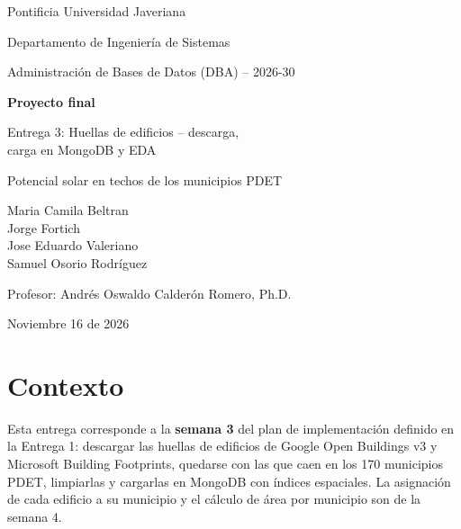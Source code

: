 \documentclass[11pt,a4paper]{article}
\begin{document}
\begin{titlepage}
  \centering
  {\large Pontificia Universidad Javeriana\par}
  {\large Departamento de Ingeniería de Sistemas\par}
  \vspace{0.8cm}
  {\large Administración de Bases de Datos (DBA) -- 2026-30\par}
  \vspace{2.5cm}
  {\Huge\bfseries Proyecto final\par}
  \vspace{1cm}
  {\LARGE Entrega 3: Huellas de edificios -- descarga,\\ carga en MongoDB y EDA\par}
  \vspace{1cm}
  {\large Potencial solar en techos de los municipios PDET\par}
  \vspace{3cm}
  {\large
    Maria Camila Beltran \\
    \vspace{0.5cm}
    Jorge Fortich \\
    \vspace{0.5cm}
    Jose Eduardo Valeriano \\
    \vspace{0.5cm}
    Samuel Osorio Rodríguez\par}
  \vspace{3cm}
  {\large Profesor: Andrés Oswaldo Calderón Romero, Ph.D.\par}
  \vspace{3cm}
  {\large {Noviembre 16 de 2026}\par}
\end{titlepage}

\tableofcontents
\newpage

\section{Contexto}
\label{sec:contexto}

Esta entrega corresponde a la \textbf{semana 3} del plan de implementación
definido en la Entrega 1: descargar las huellas de edificios de Google Open
Buildings v3 y Microsoft Building Footprints, quedarse con las que caen en los
170 municipios PDET, limpiarlas y cargarlas en MongoDB con índices espaciales.
La asignación de cada edificio a su municipio y el cálculo de área por
municipio son de la semana 4.
\end{document}
